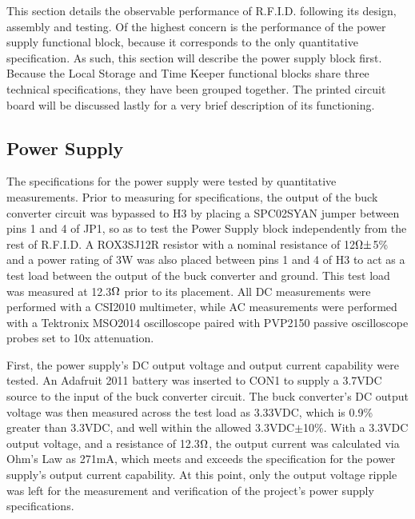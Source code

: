     This section details the observable performance of R.F.I.D. following its design, assembly and testing.
    Of the highest concern is the performance of the power supply functional block, because it corresponds to the only quantitative specification. As such, this section will describe the power supply block first.
    Because the Local Storage and Time Keeper functional blocks share three technical specifications, they have been grouped together.
    The printed circuit board will be discussed lastly for a very brief description of its functioning.

\subsection{Power Supply}
The specifications for the power supply were tested by quantitative measurements.  Prior to measuring for specifications, the output of the buck converter circuit was bypassed to H3 by placing a SPC02SYAN jumper between pins 1 and 4 of JP1, so as to test the Power Supply block independently from the rest of R.F.I.D. A ROX3SJ12R resistor with a nominal resistance of 12$\ohm{\pm}$5\% and a power rating of 3W was also placed between pins 1 and 4 of H3 to act as a test load between the output of the buck converter and ground. This test load was measured at 12.3$\ohm$ prior to its placement. All DC measurements were performed with a CSI2010 multimeter, while AC measurements were performed with a Tektronix MSO2014 oscilloscope paired with PVP2150 passive oscilloscope probes set to 10x attenuation.

First, the power supply's DC output voltage and output current capability were tested. An Adafruit 2011 battery was inserted to CON1 to supply a 3.7VDC source to the input of the buck converter circuit. The buck converter's DC output voltage was then measured across the test load as 3.33VDC, which is 0.9\% greater than 3.3VDC, and well within the allowed 3.3VDC$\pm$10\%. With a 3.3VDC output voltage, and a resistance of 12.3$\ohm$, the output current was calculated via Ohm's Law as 271mA, which meets and exceeds the specification for the power supply's output current capability. At this point, only the output voltage ripple was left for the measurement and verification of the project's power supply specifications.


